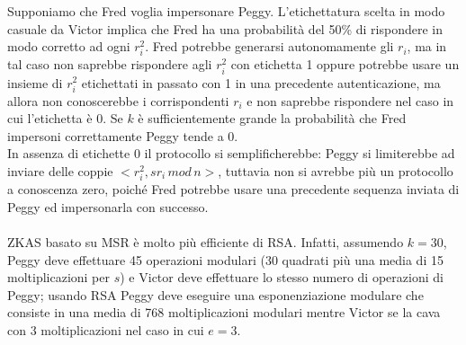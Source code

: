 Supponiamo che Fred voglia impersonare Peggy. L'etichettatura scelta in modo casuale da Victor implica che Fred ha una probabilità del 50\% di rispondere in modo corretto ad ogni $r_{i}^2$. Fred potrebbe generarsi autonomamente gli $r_{i}$, ma in tal caso non saprebbe rispondere agli $r_{i}^2$ con etichetta 1 oppure potrebbe usare un insieme di $r_{i}^2$ etichettati in passato con 1 in una precedente autenticazione, ma allora non conoscerebbe i corrispondenti $r_{i}$ e non saprebbe rispondere nel caso in cui l'etichetta è 0. Se $k$ è sufficientemente grande la probabilità che Fred impersoni correttamente Peggy tende a 0. \\
In assenza di etichette 0 il protocollo si semplificherebbe: Peggy si limiterebbe ad inviare delle coppie $<r_{i}^2, sr_{i} \, mod \, n>$, tuttavia non si avrebbe più un protocollo a conoscenza zero, poiché Fred potrebbe usare una precedente sequenza inviata di Peggy ed impersonarla con successo. \\ \\
ZKAS basato su MSR è molto più efficiente di RSA. Infatti, assumendo $k = 30$, Peggy deve effettuare 45 operazioni modulari (30 quadrati più una media di 15 moltiplicazioni per $s$) e Victor deve effettuare lo stesso numero di operazioni di Peggy; usando RSA Peggy deve eseguire una esponenziazione modulare che consiste in una media di 768 moltiplicazioni modulari mentre Victor se la cava con 3 moltiplicazioni nel caso in cui $e = 3$.
